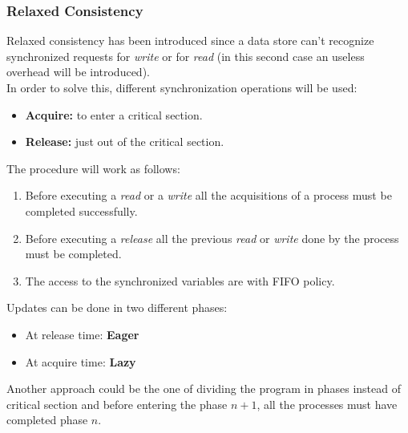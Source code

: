 \subsubsection{Relaxed Consistency}
Relaxed consistency has been introduced since a data store can't recognize synchronized requests for \textit{write} or for \textit{read} (in this second case an useless overhead will be introduced).\\
In order to solve this, different synchronization operations will be used:
\begin{itemize}
	\item \textbf{Acquire: }to enter a critical section.
	\item \textbf{Release: }just out of the critical section.
\end{itemize}
The procedure will work as follows:
\begin{enumerate}
	\item Before executing a \textit{read} or a \textit{write} all the acquisitions of a process must be completed successfully.
	\item Before executing a \textit{release} all the previous \textit{read} or \textit{write} done by the process must be completed.
	\item The access to the synchronized variables are with FIFO policy.
\end{enumerate}
Updates can be done in two different phases:
\begin{itemize}
	\item At release time: \textbf{Eager}
	\item At acquire time: \textbf{Lazy}
\end{itemize}
Another approach could be the one of dividing the program in phases instead of critical section and before entering the phase $n+1$, all the processes must have completed phase $n$.

